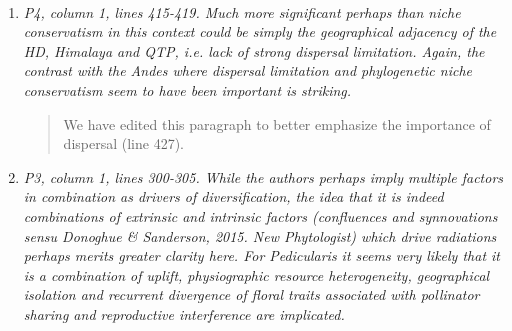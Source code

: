 \documentclass[11pt]{letter}
\begin{document}
\begin{letter}{ \\

}
\begin{enumerate}
  \begin{quote}
    We have expanded our discussion of the Cerrado and thank the
    reviewer for these insights.
  \end{quote}

  \textit{First, the idea of "colonization" with its implication of
    some form of geographical dispersal from adjacent areas, may not
    apply in the case of the Cerrado, where more likely Cerrado
    lineages simply adapted from ancestral forest lineages to tolerate
    fire in situ with the expansion of savanna grasslands associated
    with Pliocene formation of the Cerrado, as suggested by Simon et
    al (2009).}

  \begin{quote}
    Thank you for this correction, this is clearly stated in Simon et
    al. We have replaced ``colonization'' with ``in situ adaptation''
    (line 405).
  \end{quote}

  \textit{Furthermore, it is also wrong to suggest that there is
    limited in situ diversification of Cerrado lineages. There are
    several well-documented examples of clades in the Cerrado that
    show accelerated rates of in situ species diversification
    generating clades of up to 50 or more species, especially in the
    higher campos rupestres habitats embedded within the Cerrado
    s.l. (see e.g. Mimosa Koenen et al 2013 S Afr J Bot; Calliandra de
    Souza et al 2014 Taxon 62: 1201-1220; Chamaecrista Rando et al
    2016 Int J Plant Sci 177: 3-17).}

  \begin{quote}
    We have revised the section to include this point and references
    (line 407).
  \end{quote}

\item \textit{P4, column 1, lines 415-419. Much more significant
    perhaps than niche conservatism in this context could be simply
    the geographical adjacency of the HD, Himalaya and QTP, i.e. lack
    of strong dispersal limitation. Again, the contrast with the Andes
    where dispersal limitation and phylogenetic niche conservatism
    seem to have been important is striking.}

  \begin{quote}
    We have edited this paragraph to better emphasize the importance
    of dispersal (line 427).
  \end{quote}

\item \textit{P3, column 1, lines 300-305. While the authors perhaps
    imply multiple factors in combination as drivers of
    diversification, the idea that it is indeed combinations of
    extrinsic and intrinsic factors (confluences and synnovations
    sensu Donoghue \& Sanderson, 2015. New Phytologist) which drive
    radiations perhaps merits greater clarity here. For Pedicularis it
    seems very likely that it is a combination of uplift,
    physiographic resource heterogeneity, geographical isolation and
    recurrent divergence of floral traits associated with pollinator
    sharing and reproductive interference are implicated.}


\end{enumerate}
\end{letter}
\end{document}
